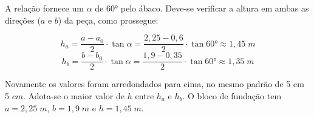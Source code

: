 A relação fornece um $\alpha$ de $\ang{60}$ pelo ábaco. Deve-se verificar a altura em ambas as direções ($a$ e $b$) da peça, como prossegue:

$$h_a=\frac{a-a_0}{2}\cdot \tan{\alpha}=\frac{2,25-0,6}{2}\cdot \tan{\ang{60}}\approx 1,45\;m$$
$$h_b=\frac{b-b_0}{2}\cdot \tan{\alpha}=\frac{1,9-0,35}{2}\cdot \tan{\ang{60}}\approx 1,35\;m$$

Novamente os valores foram arredondados para cima, no mesmo padrão de 5 em 5 $cm$. Adota-se o maior valor de $h$ entre $h_a$ e $h_b$. O bloco de fundação tem $a=2,25\;m$, $b=1,9\;m$ e $h=1,45\;m$.

